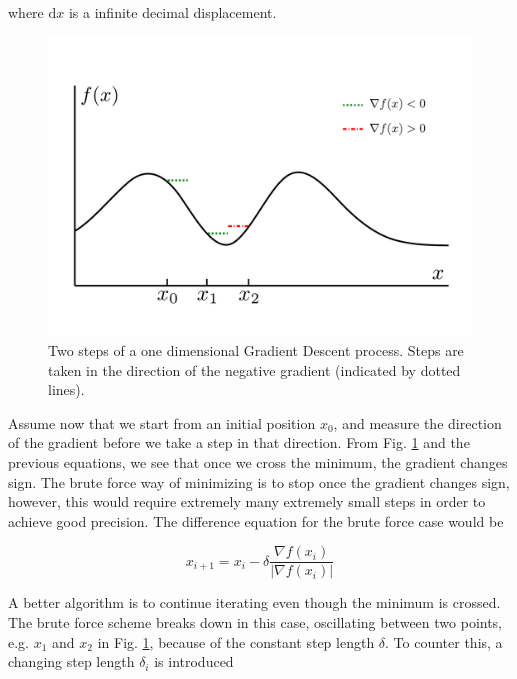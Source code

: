 where $\mathrm{d}x$ is a infinite decimal displacement. 

\begin{figure}
 \begin{center}
  \includegraphics[scale=0.3]{../Graphics/SGD.pdf}
  \caption{Two steps of a one dimensional Gradient Descent process. Steps are taken in the direction of the negative gradient (indicated by dotted lines).}
  \label{fig:SGD}
 \end{center}
\end{figure}

Assume now that we start from an initial position $x_0$, and measure the direction of the gradient before we take a step in that direction. From Fig. \ref{fig:SGD} and the previous equations, we see that once we cross the minimum, the gradient changes sign. The brute force way of minimizing is to stop once the gradient changes sign, however, this would require extremely many extremely small steps in order to achieve good precision. The difference equation for the brute force case would be

\begin{equation}
 x_{i+1} = x_i - \delta\frac{\nabla f(x_i)}{|\nabla f(x_i)|}
\end{equation}


A better algorithm is to continue iterating even though the minimum is crossed. The brute force scheme breaks down in this case, oscillating between two points, e.g. $x_1$ and $x_2$ in Fig. \ref{fig:SGD}, because of the constant step length $\delta$. To counter this, a changing step length $\delta_i$ is introduced



